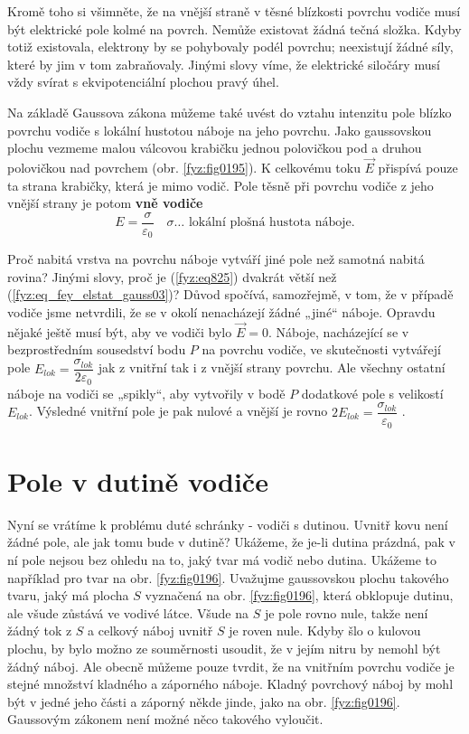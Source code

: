   Kromě toho si všimněte, že na vnější straně v těsné blízkosti povrchu vodiče musí být 
  elektrické pole kolmé na povrch. Nemůže existovat žádná tečná složka. Kdyby totiž existovala, 
  elektrony by se pohybovaly podél povrchu; neexistují žádné síly, které by jim v tom 
  zabraňovaly. Jinými slovy víme, že elektrické siločáry musí vždy svírat s ekvipotenciální 
  plochou pravý úhel.
  
  Na základě Gaussova zákona můžeme také uvést do vztahu intenzitu pole blízko povrchu vodiče s 
  lokální hustotou náboje na jeho povrchu. Jako gaussovskou plochu vezmeme malou válcovou 
  krabičku jednou polovičkou pod a druhou polovičkou nad povrchem (obr. 
  \ref{fyz:fig0195}). K celkovému toku \(\vec{E}\) přispívá pouze ta strana 
  krabičky, která je mimo vodič. Pole těsně při povrchu vodiče z jeho vnější strany je potom 
  \textbf{vně vodiče}
  \begin{equation}\label{fyz:eq825}
    E = \frac{\sigma}{\varepsilon_0}  \quad\text{\(\sigma\ldots\) lokální plošná hustota 
    náboje}.
  \end{equation}
  
  Proč nabitá vrstva na povrchu náboje vytváří jiné pole než samotná nabitá rovina? Jinými 
  slovy, proč je (\ref{fyz:eq825}) dvakrát větší než 
  (\ref{fyz:eq_fey_elstat_gauss03})? Důvod spočívá, samozřejmě, v tom, že v případě vodiče jsme 
  netvrdili, že se v okolí nenacházejí žádné „jiné“ náboje. Opravdu nějaké ještě musí být, aby 
  ve vodiči bylo \(\vec{E} = 0\). Náboje, nacházející se v bezprostředním sousedství bodu \(P\) 
  na povrchu vodiče, ve skutečnosti vytvářejí pole \(E_{lok}= 
  \dfrac{\sigma_{lok}}{2\varepsilon_0}\) jak z vnitřní tak i z vnější strany povrchu. Ale 
  všechny ostatní náboje na vodiči se „spikly“, aby vytvořily v bodě \(P\) dodatkové pole s 
  velikostí \(E_{lok}\). Výsledné vnitřní pole je pak nulové a vnější je rovno \(2E_{lok} = 
  \dfrac{\sigma_{lok}}{\varepsilon_0}\) \cite[s.~93]{Feynman02}.
  
\section{Pole v dutině vodiče}\label{fyz:IIchapVsecIX}
  Nyní se vrátíme k problému duté schránky - vodiči s dutinou. Uvnitř kovu není žádné pole, ale 
  jak tomu bude v dutině? Ukážeme, že je-li dutina prázdná, pak v ní pole nejsou bez ohledu na 
  to, jaký tvar má vodič nebo dutina. Ukážeme to například pro tvar na obr. \ref{fyz:fig0196}. 
  Uvažujme gaussovskou plochu takového tvaru, jaký má plocha \(S\) vyznačená na obr. 
  \ref{fyz:fig0196}, která obklopuje dutinu, ale všude zůstává ve vodivé látce. Všude na \(S\) je 
  pole rovno nule, takže není žádný tok z \(S\) a celkový náboj uvnitř \(S\) je roven nule. Kdyby 
  šlo o kulovou plochu, by bylo možno ze souměrnosti usoudit, že v jejím nitru by nemohl být žádný 
  náboj. Ale obecně můžeme pouze tvrdit, že na vnitřním povrchu vodiče je stejné množství kladného 
  a záporného náboje. Kladný povrchový náboj by mohl být v jedné jeho části a záporný někde jinde, 
  jako na obr. \ref{fyz:fig0196}. Gaussovým zákonem není možné něco takového vyloučit.
  
